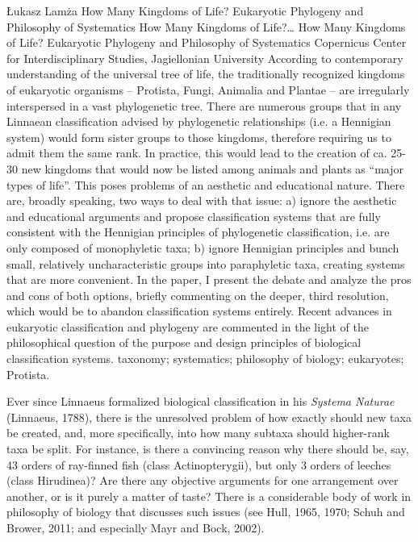 \begin{artengenv}
	{Łukasz Lamża}
	{How Many Kingdoms of Life? Eukaryotic Phylogeny and Philosophy of Systematics}
	{How Many Kingdoms of Life?\ldots}
	{How Many Kingdoms of Life? Eukaryotic Phylogeny and Philosophy of Systematics}
	{Copernicus Center for Interdisciplinary Studies, Jagiellonian University}
	{According to contemporary understanding of the universal tree of life, the traditionally recognized kingdoms of
		eukaryotic organisms – Protista, Fungi, Animalia and Plantae – are irregularly interspersed in a vast phylogenetic
		tree. There are numerous groups that in any Linnaean classification advised by phylogenetic relationships (i.e. a
		Hennigian system) would form sister groups to those kingdoms, therefore requiring us to admit them the same rank. In
		practice, this would lead to the creation of ca. 25-30 new kingdoms that would now be listed among animals and plants
		as “major types of life”. This poses problems of an aesthetic and educational nature. There are, broadly speaking, two
		ways to deal with that issue: a) ignore the aesthetic and educational arguments and propose classification systems that
		are fully consistent with the Hennigian principles of phylogenetic classification, i.e. are only composed of
		monophyletic taxa; b) ignore Hennigian principles and bunch small, relatively uncharacteristic groups into paraphyletic
		taxa, creating systems that are more convenient. In the paper, I present the debate and analyze the pros and cons of
		both options, briefly commenting on the deeper, third resolution, which would be to abandon classification systems
		entirely. Recent advances in eukaryotic classification and phylogeny are commented in the light of the philosophical
		question of the purpose and design principles of biological classification systems.}
	{taxonomy; systematics; philosophy of biology; eukaryotes; Protista.}



\lettrine[loversize=0.13,lines=2,lraise=-0.05,nindent=0em,findent=0.2pt]%
{E}{}ver since Linnaeus formalized biological classification in his \textit{Systema Naturae}
\label{ref:RNDRPHrvYOnL2}(Linnaeus, 1788), there is the unresolved problem of how exactly should new taxa be created,
and, more specifically, into how many subtaxa should higher-rank taxa be split. For instance, is there a convincing
reason why there should be, say, 43 orders of ray-finned fish (class Actinopterygii), but only 3 orders of leeches
(class Hirudinea)? Are there any objective arguments for one arrangement over another, or is it purely a matter of
taste? There is a considerable body of work in philosophy of biology that discusses such issues
\label{ref:RNDfhQVj97gMS}(see Hull, 1965, 1970; Schuh and Brower, 2011; and especially Mayr and Bock, 2002).


\end{artengenv}
